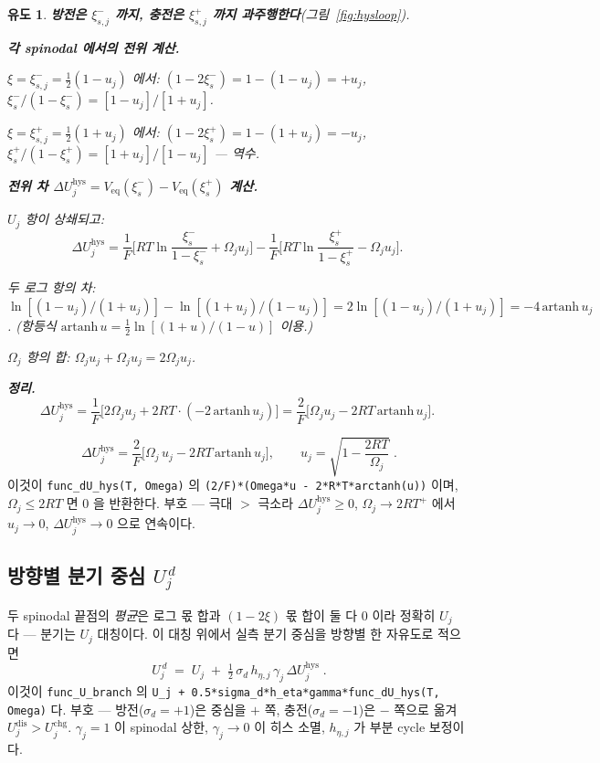 \documentclass[11pt,a4paper]{article}
\newtheorem*{derivebox}{유도}
\newcommand{\eq}{\mathrm{eq}}
\newcommand{\dis}{\mathrm{dis}}
\newcommand{\chg}{\mathrm{chg}}
\newcommand{\hys}{\mathrm{hys}}
\newcommand{\code}[1]{\texttt{#1}}
\begin{document}
\begin{derivebox}
\textbf{방전은 $\xi_{s,j}^-$ 까지, 충전은 $\xi_{s,j}^+$ 까지 과주행한다}(그림~\ref{fig:hysloop}).

\textbf{각 spinodal 에서의 전위 계산.}

$\xi=\xi_{s,j}^-=\tfrac12(1-u_j)$ 에서: $(1-2\xi_{s}^-)=1-(1-u_j)=+u_j$,
$\xi_{s}^-/(1-\xi_{s}^-)=[1-u_j]/[1+u_j]$.

$\xi=\xi_{s,j}^+=\tfrac12(1+u_j)$ 에서: $(1-2\xi_{s}^+)=1-(1+u_j)=-u_j$,
$\xi_{s}^+/(1-\xi_{s}^+)=[1+u_j]/[1-u_j]$ — 역수.

\textbf{전위 차 $\Delta U_j^\hys = V_{\eq}(\xi_s^-) - V_{\eq}(\xi_s^+)$ 계산.}

$U_j$ 항이 상쇄되고:
\begin{equation*}
\Delta U_j^\hys
=\frac{1}{F}\Big[RT\ln\frac{\xi_s^-}{1-\xi_s^-}+\Omega_j u_j\Big]
-\frac{1}{F}\Big[RT\ln\frac{\xi_s^+}{1-\xi_s^+}-\Omega_j u_j\Big].
\end{equation*}

두 로그 항의 차: $\ln[(1-u_j)/(1+u_j)]-\ln[(1+u_j)/(1-u_j)]=2\ln[(1-u_j)/(1+u_j)]=-4\,\mathrm{artanh}\,u_j$.
(항등식 $\mathrm{artanh}\,u=\tfrac12\ln[(1+u)/(1-u)]$ 이용.)

$\Omega_j$ 항의 합: $\Omega_j u_j+\Omega_j u_j=2\Omega_j u_j$.

\textbf{정리.}
\begin{equation*}
\Delta U_j^\hys
=\frac{1}{F}\Big[2\Omega_j u_j+2RT\cdot(-2\,\mathrm{artanh}\,u_j)\Big]
=\frac{2}{F}\Big[\Omega_j u_j-2RT\,\mathrm{artanh}\,u_j\Big].
\end{equation*}
\end{derivebox}
\begin{equation}
\boxed{\;\Delta U_j^\hys
=\frac{2}{F}\Big[\Omega_j\,u_j-2RT\,\mathrm{artanh}\,u_j\Big],
\qquad u_j=\sqrt{1-\frac{2RT}{\Omega_j}}\;.}
\label{eq:dUhys}
\end{equation}
이것이 \code{func\_dU\_hys(T, Omega)} 의 \code{(2/F)*(Omega*u - 2*R*T*arctanh(u))} 이며,
$\Omega_j\le2RT$ 면 $0$ 을 반환한다. 부호 — 극대 $>$ 극소라 $\Delta U_j^\hys\ge0$,
$\Omega_j\to2RT^+$ 에서 $u_j\to0$, $\Delta U_j^\hys\to0$ 으로 연속이다.

\subsection{방향별 분기 중심 $U_j^{\,d}$}

두 spinodal 끝점의 \emph{평균}은 로그 몫 합과 $(1-2\xi)$ 몫 합이 둘 다 $0$ 이라 정확히 $U_j$ 다 — 분기는 $U_j$
대칭이다. 이 대칭 위에서 실측 분기 중심을 방향별 한 자유도로 적으면
\begin{equation}
\boxed{\;U_j^{\,d}\;=\;U_j\;+\;\tfrac12\,\sigma_d\,h_{\eta,j}\,\gamma_j\,\Delta U_j^\hys\;.}
\label{eq:Ubranch}
\end{equation}
이것이 \code{func\_U\_branch} 의 \code{U\_j + 0.5*sigma\_d*h\_eta*gamma*func\_dU\_hys(T, Omega)} 다.
부호 — 방전($\sigma_d=+1$)은 중심을 $+$ 쪽, 충전($\sigma_d=-1$)은 $-$ 쪽으로 옮겨 $U_j^{\dis}>U_j^{\chg}$.
$\gamma_j=1$ 이 spinodal 상한, $\gamma_j\to0$ 이 히스 소멸, $h_{\eta,j}$ 가 부분 cycle 보정이다.
\end{document}
